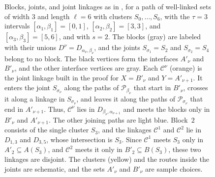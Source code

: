 \documentclass[fontsize=12pt,leading=14pt]{fullpaper}
\newcommand{\Ccal}{\mathcal{C}}
\newcommand{\Pcal}{\mathcal{P}}
\begin{document}
\begin{figure}[ht]
  \caption{Blocks, joints, and joint linkages as in , for a path of well-linked sets of width $3$ and length $\ell=6$ with clusters $S_0,\dots,S_6$, with the $\tau=3$ intervals $[\alpha_1,\beta_1]=[0,1]$, $[\alpha_2,\beta_2]=[3,3]$, and $[\alpha_3,\beta_3]=[5,6]$, and with $s=2$.
    The blocks (gray) are labeled with their unions $D^\nu=D_{\alpha_\nu,\beta_\nu}$, and the joints $S_{\sigma_1}=S_2$ and $S_{\sigma_2}=S_4$ belong to no block.
    The black vertices form the interfaces $A'_\nu$ and $B'_\nu$, and the other interface vertices are gray.
    Each $\Ccal^\nu$ (orange) is the joint linkage built in the proof for $X=B'_\nu$ and $Y=A'_{\nu+1}$.
    It enters the joint $S_{\sigma_\nu}$ along the paths of $\Pcal_{\beta_\nu}$ that start in $B'_\nu$, crosses it along a linkage in $S_{\sigma_\nu}$, and leaves it along the paths of $\Pcal_{\sigma_\nu}$ that end in $A'_{\nu+1}$.
    Thus, $\Ccal^\nu$ lies in $D_{\beta_\nu,\alpha_{\nu+1}}$ and meets the blocks only in $B'_\nu$ and $A'_{\nu+1}$.
    The other joining paths are light blue.
    Block~$2$ consists of the single cluster $S_3$, and the linkages $\Ccal^1$ and $\Ccal^2$ lie in $D_{1,3}$ and $D_{3,5}$, whose intersection is $S_3$.
    Since $\Ccal^1$ meets $S_3$ only in $A'_2\subseteq A(S_3)$, and $\Ccal^2$ meets it only in $B'_2\subseteq B(S_3)$, these two linkages are disjoint.
  The clusters (yellow) and the routes inside the joints are schematic, and the sets $A'_\nu$ and $B'_\nu$ are sample choices.}
  \label{fig:s3-blocks}
\end{figure}
\end{document}
